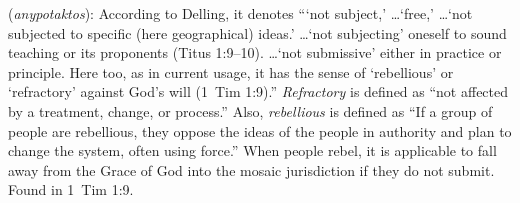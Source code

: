 \item[Rebellious,]

(\textit{anypotaktos}):
According to Delling, it denotes ```not subject,' \ldots `free,' \ldots `not subjected to specific (here geographical) ideas.' \ldots `not subjecting' oneself to sound teaching or its proponents (Titus 1:9--10). \ldots`not submissive' either in practice or principle. Here too, as in current usage, it has the sense of `rebellious' or `refractory' against God's will (1~Tim 1:9).''
\emph{Refractory} is defined as ``not affected by a treatment, change, or process.'' Also, \emph{rebellious} is defined as ``If a group of people are rebellious, they oppose the ideas of the people in authority and plan to change the system, often using force.'' When people rebel, it is applicable to fall away from the Grace of God into the mosaic jurisdiction if they do not submit.
Found in 1~Tim 1:9.
